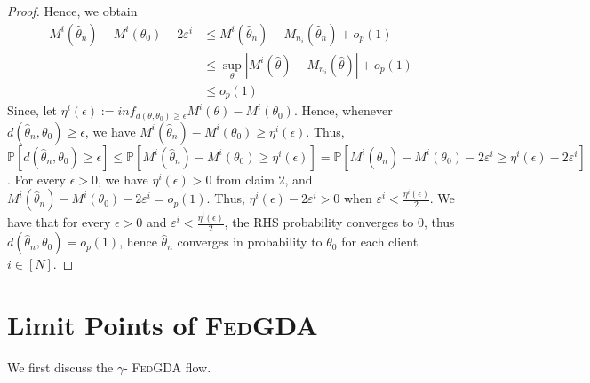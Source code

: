 \documentclass{article}
\newcommand{\fgda}{\textsc{FedGDA}\xspace}
\theoremstyle{definition}
\begin{document}
\begin{proof}
Hence, we obtain
\begin{align*}
M^i(\hat\theta_{n})-M^i(\theta_0)-2\varepsilon^i&\leq M^i(\hat\theta_{n})-M_{n_i}(\hat\theta_{n}) + o_p(1)\\
&\leq \sup_{\theta}|M^i(\hat\theta)-M_{n_i}(\hat\theta)| + o_p(1)\\
& \leq o_p(1)
\end{align*}
Since, let $\eta^i(\epsilon):=inf_{d(\theta,\theta_0)\geq \epsilon} M^i(\theta)-M^i(\theta_0)$. Hence, whenever $d(\hat\theta_{n},\theta_0)\geq \epsilon$, we have $M^i(\hat\theta_{n})-M^i(\theta_0)\geq \eta^i(\epsilon)$. Thus, $\mathbb{P}[d(\hat\theta_{n},\theta_0)\geq \epsilon]\leq \mathbb{P}[M^i(\hat\theta_{n})-M^i(\theta_0)\geq \eta^i(\epsilon)]=\mathbb{P}[M^i(\hat\theta_{n})-M^i(\theta_0)-2\varepsilon^i\geq \eta^i(\epsilon)-2\varepsilon^i]$. For every $\epsilon>0$, we have $\eta^i(\epsilon)>0$ from claim 2, and $M^i(\hat\theta_{n})-M^i(\theta_0)-2\varepsilon^i= o_p(1)$. Thus, $\eta^i(\epsilon)-2\varepsilon^i>0$ when $\varepsilon^i<\frac{\eta^i(\epsilon)}{2}$. We have that for every $\epsilon>0$ and $\varepsilon^i<\frac{\eta^i(\epsilon)}{2}$, the RHS probability converges to $0$, thus $d(\hat\theta_{n},\theta_0)=o_p(1)$, hence $\hat\theta_{n}$ converges in probability to $\theta_0$ for each client $i\in[N].$






\end{proof} 

\section{Limit Points of \fgda }


We first discuss the $\gamma$- \fgda flow.
\end{document}

